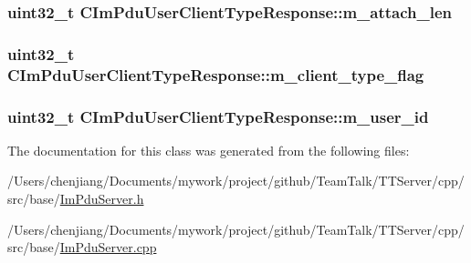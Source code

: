 \subsubsection[{m\+\_\+attach\+\_\+len}]{\setlength{\rightskip}{0pt plus 5cm}uint32\+\_\+t C\+Im\+Pdu\+User\+Client\+Type\+Response\+::m\+\_\+attach\+\_\+len\hspace{0.3cm}{\ttfamily [private]}}\label{class_c_im_pdu_user_client_type_response_a519d9785d4e0e59102b7cd7bd00b6ece}
\hypertarget{class_c_im_pdu_user_client_type_response_a61a5a08af6e2c1a81572f830b4abac40}{}
\subsubsection[{m\+\_\+client\+\_\+type\+\_\+flag}]{\setlength{\rightskip}{0pt plus 5cm}uint32\+\_\+t C\+Im\+Pdu\+User\+Client\+Type\+Response\+::m\+\_\+client\+\_\+type\+\_\+flag\hspace{0.3cm}{\ttfamily [private]}}\label{class_c_im_pdu_user_client_type_response_a61a5a08af6e2c1a81572f830b4abac40}
\hypertarget{class_c_im_pdu_user_client_type_response_a180adf9f6a21c7f1a7800fa4d7f613f4}{}
\subsubsection[{m\+\_\+user\+\_\+id}]{\setlength{\rightskip}{0pt plus 5cm}uint32\+\_\+t C\+Im\+Pdu\+User\+Client\+Type\+Response\+::m\+\_\+user\+\_\+id\hspace{0.3cm}{\ttfamily [private]}}\label{class_c_im_pdu_user_client_type_response_a180adf9f6a21c7f1a7800fa4d7f613f4}


The documentation for this class was generated from the following files\+:\begin{DoxyCompactItemize}
\item 
/\+Users/chenjiang/\+Documents/mywork/project/github/\+Team\+Talk/\+T\+T\+Server/cpp/src/base/\hyperlink{_im_pdu_server_8h}{Im\+Pdu\+Server.\+h}\item 
/\+Users/chenjiang/\+Documents/mywork/project/github/\+Team\+Talk/\+T\+T\+Server/cpp/src/base/\hyperlink{_im_pdu_server_8cpp}{Im\+Pdu\+Server.\+cpp}\end{DoxyCompactItemize}
